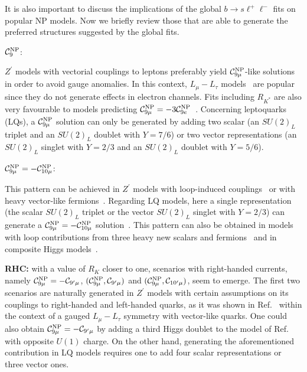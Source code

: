 \documentclass[10pt]{article}
\begin{document}
It is also important to discuss the implications of the global $b\to s\ell^+\ell^-$ fits on popular NP models. Now we briefly review those that are able to generate the preferred structures suggested by the global fits.

{\begin{boldmath} $\mathcal{C}_{9}^{\rm NP}$: \end{boldmath}} $Z^\prime$ models with vectorial couplings to leptons preferably yield $\mathcal{C}_{9\mu}^{\rm NP}$-like solutions in order to avoid gauge anomalies. In this context, $L_\mu-L_\tau$ models~\cite{Altmannshofer:2014cfa,Crivellin:2015mga,Altmannshofer:2016oaq,Crivellin:2015lwa,Crivellin:2016ejn} are popular since they do not generate effects in electron channels. Fits including $R_{K^*}$ are also very favourable to models predicting $\mathcal{C}_{9\mu}^{\rm NP}=-3\mathcal{C}_{9e}^{\rm NP}$~\cite{Bhatia:2017tgo}. Concerning leptoquarks (LQs), a $\mathcal{C}_{9\mu}^{\rm NP}$ solution can only be generated by adding two scalar (an $SU(2)_L$ triplet and an $SU(2)_L$ doublet with $Y=7/6$) or two vector representations (an $SU(2)_L$ singlet with $Y=2/3$ and an $SU(2)_L$ doublet with $Y=5/6$).

{\begin{boldmath} $\mathcal{C}_{9\mu}^{\rm NP}=-\mathcal{C}_{10\mu}^{\rm NP}$: \end{boldmath}} This pattern can be achieved in $Z^\prime$ models with loop-induced couplings~\cite{Belanger:2015nma} or with heavy vector-like fermions~\cite{Boucenna:2016wpr,Boucenna:2016qad}. Regarding LQ models, here a single representation (the scalar $SU(2)_L$ triplet or the vector $SU(2)_L$ singlet with $Y=2/3$) can generate a $\mathcal{C}_{9\mu}^{\rm NP}=-\mathcal{C}_{10\mu}^{\rm NP}$ solution~\cite{Gripaios:2014tna,Fajfer:2015ycq,Varzielas:2015iva,Alonso:2015sja,Calibbi:2015kma,Barbieri:2015yvd,Sahoo:2016pet}. This pattern can also be obtained in models with loop contributions from three heavy new scalars and fermions~\cite{Gripaios:2015gra,Arnan:2016cpy,Mahmoudi:2014mja,Grinstein:2018fgb,Arnan:2019uhr} and in composite Higgs models~\cite{Niehoff:2015bfa}.

{\bf RHC:} with a value of $R_K$ closer to one, scenarios with right-handed currents, namely $\mathcal{C}_{9\mu}^{\rm NP}=-\mathcal{C}_{9^\prime\mu}$, $(\mathcal{C}_{9\mu}^{\rm NP}, \mathcal{C}_{9'\mu})$ and $(\mathcal{C}_{9\mu}^{\rm NP}, \mathcal{C}_{10'\mu})$, seem to emerge. The first two scenarios are naturally generated in $Z^\prime$ models with certain assumptions on its couplings to right-handed and left-handed quarks, as it was shown in Ref.~\cite{Altmannshofer:2014cfa} within the context of a gauged $L_\mu-L_\tau$ symmetry with vector-like quarks. One could also obtain $\mathcal{C}_{9\mu}^{\rm NP}=-\mathcal{C}_{9^\prime\mu}$ by adding a third Higgs doublet to the model of Ref.~\cite{Crivellin:2015lwa} with opposite $U(1)$ charge. On the other hand, generating the aforementioned contribution in LQ models requires one to add four scalar representations or three vector ones.
\end{document}
